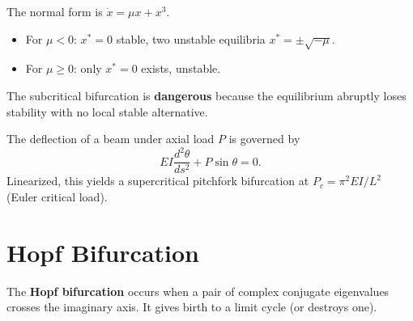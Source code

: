 \begin{theorem}
The normal form is $\dot{x} = \mu x + x^3$.
\begin{itemize}
    \item For $\mu < 0$: $x^* = 0$ stable, two unstable equilibria
    $x^* = \pm\sqrt{-\mu}$.
    \item For $\mu \geq 0$: only $x^* = 0$ exists, unstable.
\end{itemize}
The subcritical bifurcation is \textbf{dangerous} because the equilibrium
abruptly loses stability with no local stable alternative.
\end{theorem}

\begin{center}
\end{center}

\begin{example}
The deflection of a beam under axial load $P$ is governed by
\[
    EI\frac{d^2\theta}{ds^2} + P\sin\theta = 0.
\]
Linearized, this yields a supercritical pitchfork bifurcation at
$P_c = \pi^2 EI / L^2$ (Euler critical load).
\end{example}

\section{Hopf Bifurcation}

\begin{definition}
The \textbf{Hopf bifurcation} occurs when a pair of complex conjugate
eigenvalues crosses the imaginary axis. It gives birth to a limit cycle
(or destroys one).
\end{definition}

